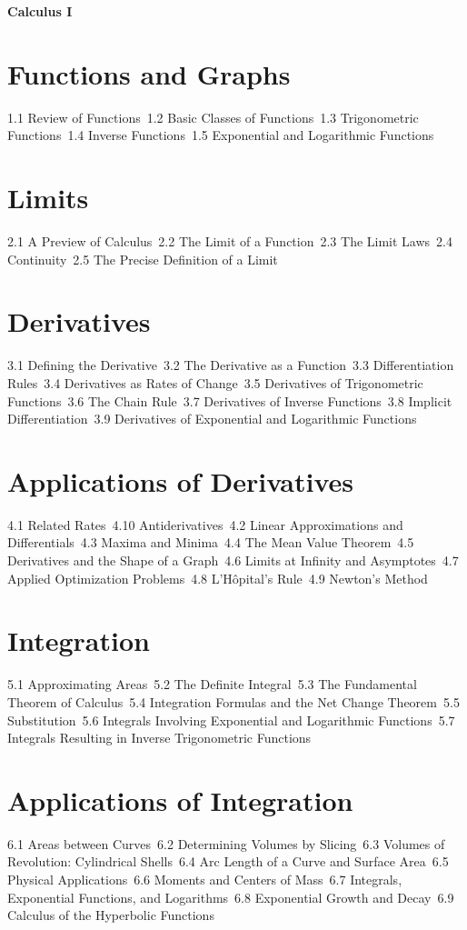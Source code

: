 {\LARGE \bf{Calculus I}}
\section{Functions and Graphs}
1.1 Review of Functions\
1.2 Basic Classes of Functions\
1.3 Trigonometric Functions\
1.4 Inverse Functions\
1.5 Exponential and Logarithmic Functions\
\section{Limits}
2.1 A Preview of Calculus\
2.2 The Limit of a Function\
2.3 The Limit Laws\
2.4 Continuity\
2.5 The Precise Definition of a Limit\
\section{Derivatives}
3.1 Defining the Derivative\
3.2 The Derivative as a Function\
3.3 Differentiation Rules\
3.4 Derivatives as Rates of Change\
3.5 Derivatives of Trigonometric Functions\
3.6 The Chain Rule\
3.7 Derivatives of Inverse Functions\
3.8 Implicit Differentiation\
3.9 Derivatives of Exponential and Logarithmic Functions\
\section{Applications of Derivatives}
4.1 Related Rates\
4.10 Antiderivatives\
4.2 Linear Approximations and Differentials\
4.3 Maxima and Minima\
4.4 The Mean Value Theorem\
4.5 Derivatives and the Shape of a Graph\
4.6 Limits at Infinity and Asymptotes\
4.7 Applied Optimization Problems\
4.8 L’Hôpital’s Rule\
4.9 Newton’s Method\
\section{Integration}
5.1 Approximating Areas\
5.2 The Definite Integral\
5.3 The Fundamental Theorem of Calculus\
5.4 Integration Formulas and the Net Change Theorem\
5.5 Substitution\
5.6 Integrals Involving Exponential and Logarithmic Functions\
5.7 Integrals Resulting in Inverse Trigonometric Functions\
\section{Applications of Integration}
6.1 Areas between Curves\
6.2 Determining Volumes by Slicing\
6.3 Volumes of Revolution: Cylindrical Shells\
6.4 Arc Length of a Curve and Surface Area\
6.5 Physical Applications\
6.6 Moments and Centers of Mass\
6.7 Integrals, Exponential Functions, and Logarithms\
6.8 Exponential Growth and Decay\
6.9 Calculus of the Hyperbolic Functions\
